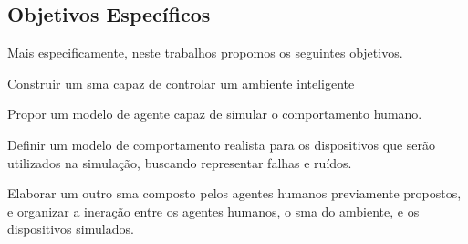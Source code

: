 \subsection{Objetivos Específicos}
\label{sec:objetivos-especificos}

    Mais especificamente, neste trabalhos propomos os seguintes objetivos.

	\begin{alineas}
		\item Construir um \acrlong{sma} capaz de controlar um ambiente inteligente %
		\item Propor um modelo de agente capaz de simular o comportamento humano.
		\item Definir um modelo de comportamento realista para os dispositivos que serão utilizados na simulação, buscando representar falhas e ruídos.
		\item Elaborar um outro \acrlong{sma} composto pelos agentes humanos previamente propostos, e organizar a ineração entre os agentes humanos, o \acrlong{sma} do ambiente, e os dispositivos simulados.
		
	\end{alineas}